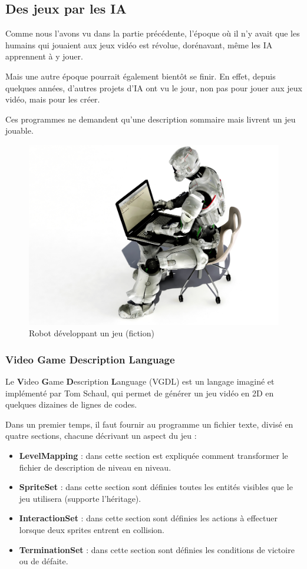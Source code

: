 \documentclass[a4paper, 12pt]{article} %
\begin{document}
\newpage
\subsection{Des jeux par les IA}

Comme nous l'avons vu dans la partie précédente, l'époque où il n'y avait que les humains qui jouaient aux jeux vidéo est révolue, dorénavant, même les IA apprennent à y jouer.

Mais une autre époque pourrait également bientôt se finir. En effet, depuis quelques années, d'autres projets d'IA ont vu le jour, non pas pour jouer aux jeux vidéo, mais pour les créer. 

Ces programmes ne demandent qu'une description sommaire mais livrent un jeu jouable.

\begin{figure}[!h]%
	\begin{center} 
		\includegraphics[width=0.60\columnwidth]{images/robotdeveloping.jpg}%
		\caption{Robot développant un jeu (fiction)}%
	\end{center}
\end{figure}

\newpage
\subsubsection{Video Game Description Language}

Le \textbf{V}ideo \textbf{G}ame \textbf{D}escription \textbf{L}anguage\cite{vgdl} (VGDL) est un langage imaginé et implémenté par Tom Schaul, qui permet de générer un jeu vidéo en 2D en quelques dizaines de lignes de codes.

Dans un premier temps, il faut fournir au programme un fichier texte, divisé en quatre sections, chacune décrivant un aspect du jeu :

\begin{itemize}
	\item \textbf{LevelMapping} : dans cette section est expliquée comment transformer le fichier de description de niveau en niveau.
	\item \textbf{SpriteSet} : dans cette section sont définies toutes les entités visibles que le jeu utilisera (supporte l'héritage).
	\item \textbf{InteractionSet} : dans cette section sont définies les actions à effectuer lorsque deux sprites entrent en collision.
	\item \textbf{TerminationSet} : dans cette section sont définies les conditions de victoire ou de défaite.
\end{itemize}
\end{document}
